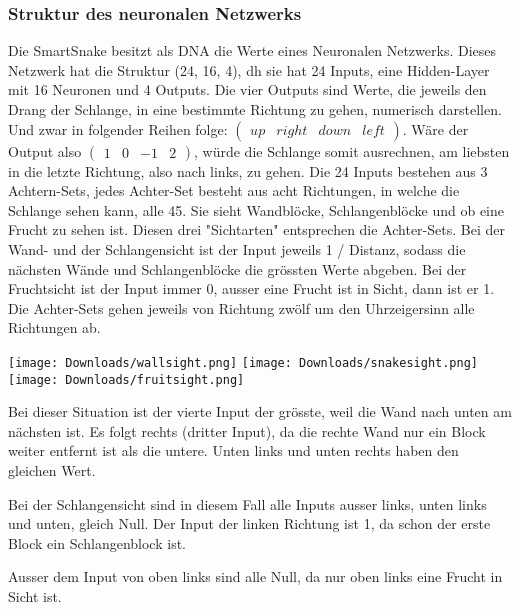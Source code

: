 \documentclass[10pt,a4paper,ngerman,english]{article}
\begin{document}
\subsubsection{Struktur des neuronalen Netzwerks}

Die SmartSnake besitzt als DNA die Werte eines Neuronalen Netzwerks. Dieses Netzwerk hat die Struktur (24, 16, 4), dh sie hat 24 Inputs, eine Hidden-Layer mit 16 Neuronen und 4 Outputs. Die vier Outputs sind Werte, die jeweils den Drang der Schlange, in eine bestimmte Richtung zu gehen, numerisch darstellen. Und zwar in folgender Reihen folge: $ \left(\begin{array}{cccc} up & right & down & left\end{array}\right) $. Wäre der Output also $ \left(\begin{array}{cccc} 1 & 0 & -1 & 2\end{array}\right) $, würde die Schlange somit ausrechnen, am liebsten in die letzte Richtung, also nach links, zu gehen. Die 24 Inputs bestehen aus 3 Achtern-Sets, jedes Achter-Set besteht aus acht Richtungen, in welche die Schlange sehen kann, alle 45\degree. Sie sieht Wandblöcke, Schlangenblöcke und ob eine Frucht zu sehen ist. Diesen drei "Sichtarten" entsprechen die Achter-Sets. Bei der Wand- und der Schlangensicht ist der Input jeweils 1 / Distanz, sodass die nächsten Wände und Schlangenblöcke die grössten Werte abgeben. Bei der Fruchtsicht ist der Input immer 0, ausser eine Frucht ist in Sicht, dann ist er 1. Die Achter-Sets gehen jeweils von Richtung zwölf um den Uhrzeigersinn alle Richtungen ab.

\begin{center}
\texttt{[image: Downloads/wallsight.png]}
\texttt{[image: Downloads/snakesight.png]}
\texttt{[image: Downloads/fruitsight.png]}
\end{center}
\begin{multicols}{3}
    Bei dieser Situation ist der vierte Input der grösste, weil die Wand nach unten am nächsten ist. Es folgt rechts (dritter Input), da die rechte Wand nur ein Block weiter entfernt ist als die untere. Unten links und unten rechts haben den gleichen Wert.
    
    \columnbreak
    
    Bei der Schlangensicht sind in diesem Fall alle Inputs ausser links, unten links und unten, gleich Null. Der Input der linken Richtung ist 1, da schon der erste Block ein Schlangenblock ist.

    \columnbreak

    Ausser dem Input von oben links sind alle Null, da nur oben links eine Frucht in Sicht ist. 

\end{multicols}
\end{document}
